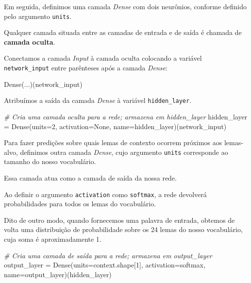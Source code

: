 \documentclass[
  brazilian,
]{article}
\newenvironment{Shaded}{}{}
\newcommand{\CommentTok}[1]{\textcolor[rgb]{0.38,0.63,0.69}{\textit{#1}}}
\newcommand{\DecValTok}[1]{\textcolor[rgb]{0.25,0.63,0.44}{#1}}
\newcommand{\NormalTok}[1]{#1}
\newcommand{\OperatorTok}[1]{\textcolor[rgb]{0.40,0.40,0.40}{#1}}
\newcommand{\StringTok}[1]{\textcolor[rgb]{0.25,0.44,0.63}{#1}}
\newcommand{\VariableTok}[1]{\textcolor[rgb]{0.10,0.09,0.49}{#1}}
\begin{document}
Em seguida, definimos uma camada \emph{Dense} com dois neurônios,
conforme definido pelo argumento \texttt{units}.

Qualquer camada situada entre as camadas de entrada e de saída é chamada
de \textbf{camada oculta}.

Conectamos a camada \emph{Input} à camada oculta colocando a variável
\texttt{network\_input} entre parênteses após a camada \emph{Dense}:

\begin{Shaded}
\begin{Highlighting}[]
\NormalTok{Dense(...)(network\_input)}
\end{Highlighting}
\end{Shaded}

Atribuímos a saída da camada \emph{Dense} à variável
\texttt{hidden\_layer}.

\begin{Shaded}
\begin{Highlighting}[]
\CommentTok{\# Cria uma camada oculta para a rede; armazena em \textquotesingle{}hidden\_layer\textquotesingle{}}
\NormalTok{hidden\_layer }\OperatorTok{=}\NormalTok{ Dense(units}\OperatorTok{=}\DecValTok{2}\NormalTok{, activation}\OperatorTok{=}\VariableTok{None}\NormalTok{, name}\OperatorTok{=}\StringTok{\textquotesingle{}hidden\_layer\textquotesingle{}}\NormalTok{)(network\_input)}
\end{Highlighting}
\end{Shaded}

Para fazer predições sobre quais lemas de contexto ocorrem próximos aos
lemas-alvo, definimos outra camada \emph{Dense}, cujo argumento
\texttt{units} corresponde ao tamanho do nosso vocabulário.

Essa camada atua como a camada de saída da nossa rede.

Ao definir o argumento \texttt{activation} como \texttt{softmax}, a rede
devolverá probabilidades para todos os lemas do vocabulário.

Dito de outro modo, quando fornecemos uma palavra de entrada, obtemos de
volta uma distribuição de probabilidade sobre os 24 lemas do nosso
vocabulário, cuja soma é aproximadamente 1.

\begin{Shaded}
\begin{Highlighting}[]
\CommentTok{\# Cria uma camada de saída para a rede; armazena em \textquotesingle{}output\_layer\textquotesingle{}}
\NormalTok{output\_layer }\OperatorTok{=}\NormalTok{ Dense(units}\OperatorTok{=}\NormalTok{context.shape[}\DecValTok{1}\NormalTok{], activation}\OperatorTok{=}\StringTok{\textquotesingle{}softmax\textquotesingle{}}\NormalTok{, name}\OperatorTok{=}\StringTok{\textquotesingle{}output\_layer\textquotesingle{}}\NormalTok{)(hidden\_layer)}
\end{Highlighting}
\end{Shaded}
\end{document}
